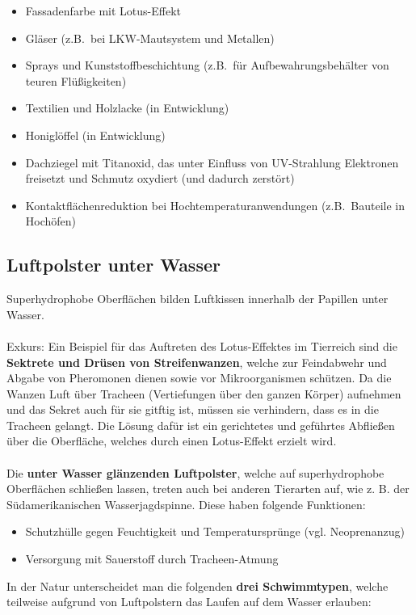 \begin{itemize}
    \item Fassadenfarbe mit Lotus-Effekt \dangersign
    \item Gläser (z.B.\ bei LKW-Mautsystem und Metallen)
    \item Sprays und Kunststoffbeschichtung (z.B.\ für Aufbewahrungsbehälter von teuren Flüßigkeiten)
    \item Textilien und Holzlacke (in Entwicklung)
    \item Honiglöffel (in Entwicklung)
    \item Dachziegel mit Titanoxid, das unter Einfluss von UV-Strahlung Elektronen freisetzt und Schmutz oxydiert (und dadurch zerstört)
    \item Kontaktflächenreduktion bei Hochtemperaturanwendungen (z.B.\ Bauteile in Hochöfen)
\end{itemize}

\subsection{Luftpolster unter Wasser}

Superhydrophobe Oberflächen bilden Luftkissen innerhalb der Papillen unter Wasser.
\\\\
Exkurs: Ein Beispiel für das Auftreten des Lotus-Effektes im Tierreich sind die \textbf{Sektrete und Drüsen von Streifenwanzen}, welche zur Feindabwehr und Abgabe von Pheromonen dienen sowie vor Mikroorganismen schützen. Da die Wanzen Luft über Tracheen (Vertiefungen über den ganzen Körper) aufnehmen und das Sekret auch für sie gitftig ist, müssen sie verhindern, dass es in die Tracheen gelangt. Die Lösung dafür ist ein gerichtetes und geführtes Abfließen über die Oberfläche, welches durch einen Lotus-Effekt erzielt wird.
\\\\
Die \textbf{unter Wasser glänzenden Luftpolster}, welche auf superhydrophobe Oberflächen schließen lassen, treten auch bei anderen Tierarten auf, wie z. B. der Südamerikanischen Wasserjagdspinne. Diese haben folgende Funktionen:

\begin{itemize}
    \item Schutzhülle gegen Feuchtigkeit und Temperatursprünge (vgl. Neoprenanzug)
    \item Versorgung mit Sauerstoff durch Tracheen-Atmung
\end{itemize}
In der Natur unterscheidet man die folgenden \textbf{drei Schwimmtypen}, welche teilweise aufgrund von Luftpolstern das Laufen auf dem Wasser erlauben:

